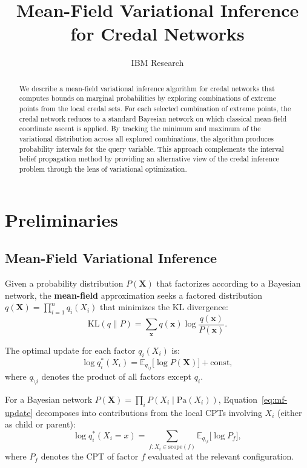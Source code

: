 \documentclass[11pt]{article}
\title{Mean-Field Variational Inference\\for Credal Networks}
\author{IBM Research}
\date{}
\begin{document}
\maketitle

\begin{abstract}
We describe a mean-field variational inference algorithm for credal networks that
computes bounds on marginal probabilities by exploring combinations of extreme points
from the local credal sets. For each selected combination of extreme points, the
credal network reduces to a standard Bayesian network on which classical mean-field
coordinate ascent is applied. By tracking the minimum and maximum of the variational
distribution across all explored combinations, the algorithm produces probability
intervals for the query variable. This approach complements the interval belief
propagation method by providing an alternative view of the credal inference problem
through the lens of variational optimization.
\end{abstract}

\section{Preliminaries}

\subsection{Mean-Field Variational Inference}

Given a probability distribution $P(\mathbf{X})$ that factorizes according to a
Bayesian network, the \textbf{mean-field} approximation seeks a factored distribution
$q(\mathbf{X}) = \prod_{i=1}^n q_i(X_i)$ that minimizes the KL divergence:
\begin{equation}\label{eq:kl}
  \mathrm{KL}(q \| P) = \sum_{\mathbf{x}} q(\mathbf{x}) \log \frac{q(\mathbf{x})}{P(\mathbf{x})}.
\end{equation}

The optimal update for each factor $q_i(X_i)$ is:
\begin{equation}\label{eq:mf-update}
  \log q_i^*(X_i) = \mathbb{E}_{q_{\setminus i}}\bigl[\log P(\mathbf{X})\bigr] + \mathrm{const},
\end{equation}
where $q_{\setminus i}$ denotes the product of all factors except $q_i$.

For a Bayesian network $P(\mathbf{X}) = \prod_i P(X_i \mid \mathrm{Pa}(X_i))$,
Equation~\eqref{eq:mf-update} decomposes into contributions from the local CPTs
involving $X_i$ (either as child or parent):
\begin{equation}\label{eq:mf-bn}
  \log q_i^*(X_i = x) = \sum_{f : X_i \in \mathrm{scope}(f)}
  \mathbb{E}_{q_{\setminus i}}\bigl[\log P_f \bigr],
\end{equation}
where $P_f$ denotes the CPT of factor $f$ evaluated at the relevant configuration.
\end{document}
